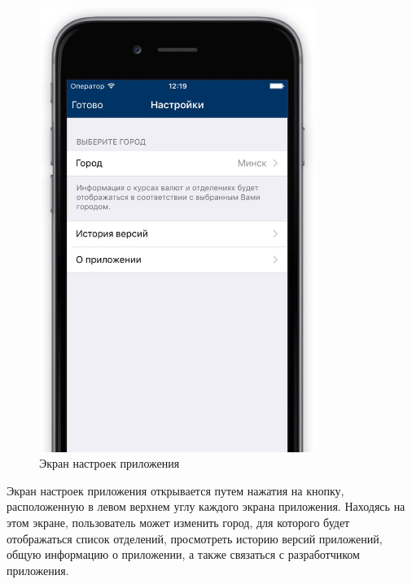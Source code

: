 \begin{figure}[h!]
  \centering
  \includegraphics[width=90mm]{pic/screen_settings}
  \caption{Экран настроек приложения}
  \label{fig:screen_settings}
\end{figure}

Экран настроек приложения открывается путем
нажатия на кнопку, расположенную в левом верхнем
углу каждого экрана приложения.
Находясь на этом экране, пользователь может изменить
город, для которого будет отображаться список отделений,
просмотреть историю версий приложений, общую информацию
о приложении, а также связаться с разработчиком приложения.
